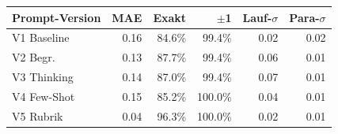 \begin{tabular}{lrrrrr}
\toprule
Prompt-Version & MAE & Exakt & $\pm$1 & Lauf-$\sigma$ & Para-$\sigma$ \\
\midrule
V1 Baseline & 0.16 & 84.6\% & 99.4\% & 0.02 & 0.02 \\
V2 Begr. & 0.13 & 87.7\% & 99.4\% & 0.06 & 0.01 \\
V3 Thinking & 0.14 & 87.0\% & 99.4\% & 0.07 & 0.01 \\
V4 Few-Shot & 0.15 & 85.2\% & 100.0\% & 0.04 & 0.01 \\
V5 Rubrik & 0.04 & 96.3\% & 100.0\% & 0.02 & 0.01 \\
\bottomrule
\end{tabular}